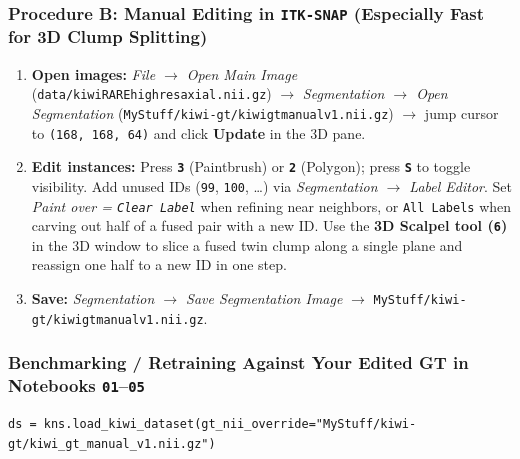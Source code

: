 \documentclass[10pt,a4paper]{article}
\renewcommand{\_}{\origunderscore\allowbreak}
\begin{document}
\subsubsection*{Procedure B: Manual Editing in \texttt{ITK-SNAP} (Especially Fast for 3D Clump Splitting)}
\begin{enumerate}
\item \textbf{Open images:} \textit{File $\to$ Open Main Image} (\texttt{data/\allowbreak{}kiwi\_20050217191129\_131073\_RARE\_high\_res\_axial.nii.gz}) $\to$ \textit{Segmentation $\to$ Open Segmentation} (\texttt{MyStuff/\allowbreak{}kiwi-gt/\allowbreak{}kiwi\_gt\_manual\_v1.nii.gz}) $\to$ jump cursor to \texttt{(168, 168, 64)} and click \textbf{Update} in the 3D pane.
\item \textbf{Edit instances:} Press \textbf{\texttt{3}} (Paintbrush) or \textbf{\texttt{2}} (Polygon); press \textbf{\texttt{S}} to toggle visibility. Add unused IDs (\texttt{99}, \texttt{100}, \ldots{}) via \textit{Segmentation $\to$ Label Editor}. Set \textit{Paint over = \texttt{Clear Label}} when refining near neighbors, or \texttt{All Labels} when carving out half of a fused pair with a new ID. Use the \textbf{3D Scalpel tool (\texttt{6})} in the 3D window to slice a fused twin clump along a single plane and reassign one half to a new ID in one step.
\item \textbf{Save:} \textit{Segmentation $\to$ Save Segmentation Image} $\to$ \texttt{MyStuff/\allowbreak{}kiwi-gt/\allowbreak{}kiwi\_gt\_manual\_v1.nii.gz}.
\end{enumerate}

\subsubsection*{Benchmarking /\allowbreak{} Retraining Against Your Edited GT in Notebooks \texttt{01}--\texttt{05}}
\begin{lstlisting}[style=pybmed]
ds = kns.load_kiwi_dataset(gt_nii_override="MyStuff/kiwi-gt/kiwi_gt_manual_v1.nii.gz")
\end{lstlisting}
\end{document}
